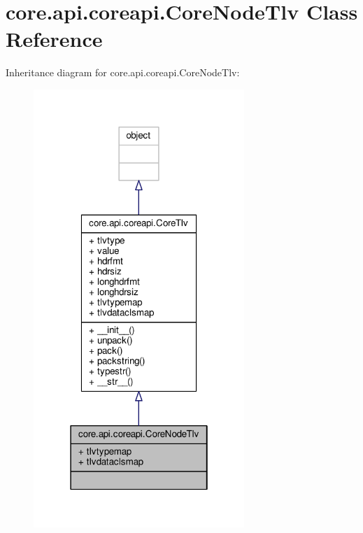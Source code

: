 \hypertarget{classcore_1_1api_1_1coreapi_1_1_core_node_tlv}{\section{core.\+api.\+coreapi.\+Core\+Node\+Tlv Class Reference}
\label{classcore_1_1api_1_1coreapi_1_1_core_node_tlv}
}


Inheritance diagram for core.\+api.\+coreapi.\+Core\+Node\+Tlv\+:
\nopagebreak
\begin{figure}[H]
\begin{center}
\leavevmode
\includegraphics[width=226pt]{classcore_1_1api_1_1coreapi_1_1_core_node_tlv__inherit__graph}
\end{center}
\end{figure}



